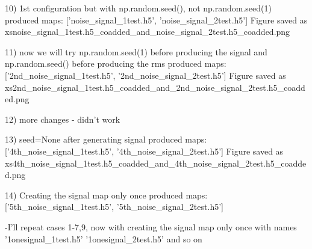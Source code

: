 10) 1st configuration but with np.random.seed(), not np.random.seed(1)  
    produced maps:  ['noise_signal_1test.h5', 'noise_signal_2test.h5']
    Figure saved as xsnoise_signal_1test.h5_coadded_and_noise_signal_2test.h5_coadded.png

11) now we will try np.random.seed(1) before producing the signal and np.random.seed() before producing the rms
    produced maps:  ['2nd_noise_signal_1test.h5', '2nd_noise_signal_2test.h5']
    Figure saved as xs2nd_noise_signal_1test.h5_coadded_and_2nd_noise_signal_2test.h5_coadded.png

12) more changes - didn't work

13) seed=None after generating signal
    produced maps:  ['4th_noise_signal_1test.h5', '4th_noise_signal_2test.h5']
    Figure saved as xs4th_noise_signal_1test.h5_coadded_and_4th_noise_signal_2test.h5_coadded.png

14) Creating the signal map only once
    produced maps:  ['5th_noise_signal_1test.h5', '5th_noise_signal_2test.h5']

-I'll repeat cases 1-7,9, now with creating the signal map only once with names '1onesignal_1test.h5' '1onesignal_2test.h5' and so on
  

  




